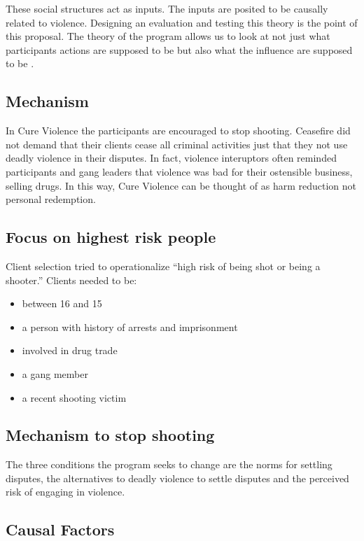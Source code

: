 \documentclass[11pt]{article}
\begin{document}
These social structures act as inputs.  The inputs are posited to be
causally related to violence. Designing an evaluation and testing this
theory is the point of this proposal.  The theory of the program
allows us to look at not just what participants actions are supposed
to be but also what the influence are supposed to be \parencite{Leeuw2003}.

\subsection{Mechanism}
\label{sec-2-2}

In Cure Violence the participants are encouraged to stop
shooting. Ceasefire did not demand that their clients cease all
criminal activities just that they not use deadly violence in their
disputes.  In fact, violence interuptors often reminded participants
and gang leaders that violence was bad for their ostensible business,
selling drugs.  In this way, Cure Violence can be thought of as harm
reduction not personal redemption.
\subsection{Focus on highest risk people}
\label{sec-2-3}

Client selection tried to operationalize ``high risk of being shot or being a shooter.'' 
Clients needed to be:

\begin{itemize}
\item between 16 and 15
\item a person with history of arrests and imprisonment
\item involved in drug trade
\item a gang member
\item a recent shooting victim
\end{itemize}
\subsection{Mechanism to stop shooting}
\label{sec-2-4}

The three conditions the program seeks to change are the norms for settling disputes, the 
alternatives to deadly violence to settle disputes and the perceived risk of engaging in violence.
\subsection{Causal Factors}
\label{sec-2-5}
\end{document}
